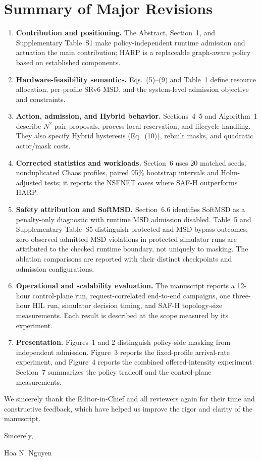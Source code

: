 \documentclass[11pt]{article}
\newcounter{reviewer}
\begin{document}
\clearpage
\section*{Summary of Major Revisions}
{\color{replyblue}
\begin{enumerate}
\item \textbf{Contribution and positioning.} The Abstract, Section~1, and Supplementary Table~S1 make policy-independent runtime admission and actuation the main contribution; HARP is a replaceable graph-aware policy based on established components.

\item \textbf{Hardware-feasibility semantics.} Eqs.~(5)--(9) and Table~1 define resource allocation, per-profile SRv6 MSD, and the system-level admission objective and constraints.
\item \textbf{Action, admission, and Hybrid behavior.} Sections~4--5 and Algorithm~1 describe \(N^2\) pair proposals, process-local reservation, and lifecycle handling. They also specify Hybrid hysteresis (Eq.~(10)), rebuilt masks, and quadratic actor/mask costs.
\item \textbf{Corrected statistics and workloads.} Section~6 uses 20 matched seeds, nonduplicated Chaos profiles, paired 95\% bootstrap intervals and Holm-adjusted tests; it reports the NSFNET cases where SAF-H outperforms HARP.

\item \textbf{Safety attribution and SoftMSD.} Section~6.6 identifies SoftMSD as a penalty-only diagnostic with runtime MSD admission disabled. Table~5 and Supplementary Table~S5 distinguish protected and MSD-bypass outcomes; zero observed admitted MSD violations in protected simulator runs are attributed to the checked runtime boundary, not uniquely to masking. The ablation comparisons are reported with their distinct checkpoints and admission configurations.
\item \textbf{Operational and scalability evaluation.} The manuscript reports a 12-hour control-plane run, request-correlated end-to-end campaigns, one three-hour HIL run, simulator decision timing, and SAF-H topology-size measurements. Each result is described at the scope measured by its experiment.
\item \textbf{Presentation.} Figures~1 and 2 distinguish policy-side masking from independent admission. Figure~3 reports the fixed-profile arrival-rate experiment, and Figure~4 reports the combined offered-intensity experiment. Section~7 summarizes the policy tradeoff and the control-plane measurements.
\end{enumerate}
}

We sincerely thank the Editor-in-Chief and all reviewers again for their time and constructive feedback, which have helped us improve the rigor and clarity of the manuscript.

\bigskip
Sincerely,

\vspace{2mm}
Hoa N. Nguyen
\end{document}
